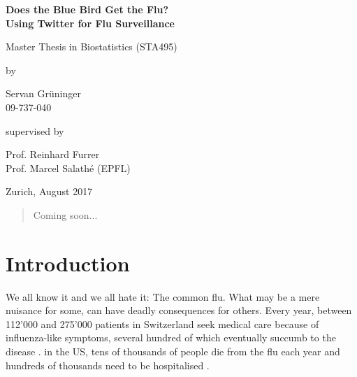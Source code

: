 \documentclass[11pt, a4paper,twoside]{report}\usepackage[]{graphicx}\usepackage[]{color}
\makeatletter
\renewcommand{\baselinestretch}{1.1}
\renewcommand\familydefault{\sfdefault}
\newcommand{\name}{Servan Grüninger}
\newcommand{\mail}{servan.grueninger@gmail.com}
\newcommand{\versiondate}{\today}
\newcommand{\supervisor}{Prof. Dr. Reinhard Furrer (UZH) \& Prof. Dr. Marcel Salathé (EPFL)}
\newcommand{\bigtitle}{Does the Blue Bird Get the Flu?}
\newcommand{\subtitle}{Using Twitter for Flu Surveillance}
\newcommand{\of}{of\xspace}
\newcommand{\HRule}{\rule{\linewidth}{0.5mm}}
\newcommand{\mytitle}[3]{
\begin{center}
\vspace*{-2.1cm}

\HRule

\vspace*{0.4cm}



\vspace*{0.4cm} \HRule

\bigskip

\textsf{\LARGE #1} \vspace*{0.5cm}

\Large{#2}

\medskip

\large{Author: \name \ (\textit{\mail})}

\medskip

\large{Supervision: \supervisor}

\medskip

Version \of \versiondate

\end{center}

\medskip
}
\makeatother
\begin{document}
\renewcommand{\baselinestretch}{1.5}\normalfont
\begin{center}
\setlength{\parindent}{0cm}
\bf\Large%
Does the Blue Bird Get the Flu?\\
Using Twitter for Flu Surveillance
\normalfont



\hrulefill

\vspace*{4cm}

\large
Master Thesis in Biostatistics (STA495)
\vspace*{12mm}

by

\vspace*{12mm}

Servan Grüninger\\
\small 09-737-040\\
\normalfont
\vspace*{4cm}

supervised by

\vspace*{1cm}

Prof. Reinhard Furrer\\
Prof. Marcel Salathé (EPFL)

\vfill

Zurich, August 2017
\end{center}
\renewcommand\familydefault{\rmdefault}\normalfont%
\setcounter{page}{0}
\thispagestyle{empty}
\cleardoublepage


\pagestyle{standard}


\begin{abstract}
Coming soon...
\end{abstract}

\thispagestyle{empty}
\cleardoublepage

\tableofcontents
\cleardoublepage


\chapter{Introduction}
\label{ch:intro}
\setcounter{page}{0}
We all know it and we all hate it: The common flu. What may be a mere nuisance for some, can have deadly consequences for others. Every year, between 112'000 and 275'000 patients in Switzerland seek medical care because of influenza-like symptoms, several hundred of which eventually succumb to the disease \citep{bag_lagebericht_2017}. in the US, tens of thousands of people die from the flu each year and hundreds of thousands need to be hospitalised \citep{rolfes_estimated_2016}.
\end{document}
